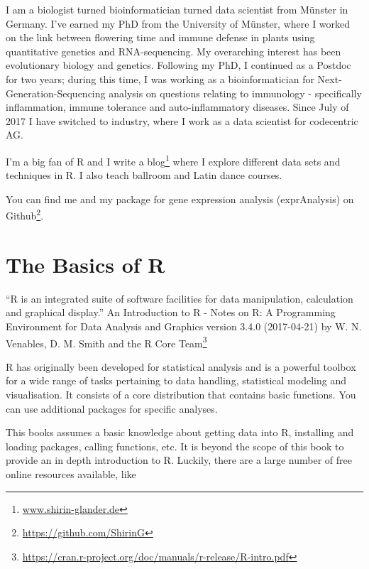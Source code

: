 \documentclass[12pt,]{krantz}
\renewenvironment{quote}{\begin{VF}}{\end{VF}}
\renewcommand{\href}[2]{#2\footnote{\url{#1}}}
\theoremstyle{definition}
\theoremstyle{definition}
\theoremstyle{definition}
\theoremstyle{remark}
\begin{document}
I am a biologist turned bioinformatician turned data scientist from
Münster in Germany. I've earned my PhD from the University of Münster,
where I worked on the link between flowering time and immune defense in
plants using quantitative genetics and RNA-sequencing. My overarching
interest has been evolutionary biology and genetics. Following my PhD, I
continued as a Postdoc for two years; during this time, I was working as
a bioinformatician for Next-Generation-Sequencing analysis on questions
relating to immunology - specifically inflammation, immune tolerance and
auto-inflammatory diseases. Since July of 2017 I have switched to
industry, where I work as a data scientist for codecentric AG.

I'm a big fan of R and I write \href{www.shirin-glander.de}{a blog}
where I explore different data sets and techniques in R. I also teach
ballroom and Latin dance courses.

You can find me and my package for gene expression analysis
(exprAnalysis) on \href{https://github.com/ShirinG}{Github}.

\chapter*{The Basics of R}\label{the-basics-of-r}


\begin{quote}
``R is an integrated suite of software facilities for data manipulation,
calculation and graphical display.''
\href{https://cran.r-project.org/doc/manuals/r-release/R-intro.pdf}{An
Introduction to R - Notes on R: A Programming Environment for Data
Analysis and Graphics version 3.4.0 (2017-04-21) by W. N. Venables, D.
M. Smith and the R Core Team}
\end{quote}

R has originally been developed for statistical analysis and is a
powerful toolbox for a wide range of tasks pertaining to data handling,
statistical modeling and visualisation. It consists of a core
distribution that contains basic functions. You can use additional
packages for specific analyses.

This books assumes a basic knowledge about getting data into R,
installing and loading packages, calling functions, etc. It is beyond
the scope of this book to provide an in depth introduction to R.
Luckily, there are a large number of free online resources available,
like
\end{document}
